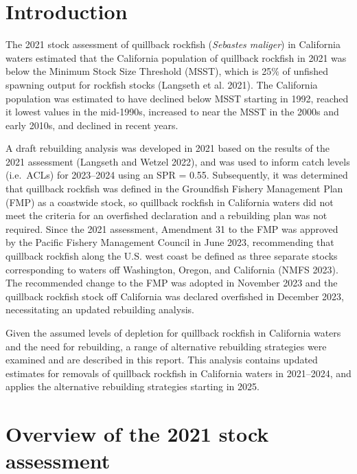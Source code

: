 \documentclass[11pt,
  letterpaper,
]{article}
\begin{document}
\hypertarget{introduction}{%
\section{Introduction}\label{introduction}}

The 2021 stock assessment of quillback rockfish (\emph{Sebastes maliger}) in California waters estimated that the California population of quillback rockfish in 2021 was below the Minimum Stock Size Threshold (MSST), which is 25\(\%\) of unfished spawning output for rockfish stocks (Langseth et al. 2021). The California population was estimated to have declined below MSST starting in 1992, reached it lowest values in the mid-1990s, increased to near the MSST in the 2000s and early 2010s, and declined in recent years.

A draft rebuilding analysis was developed in 2021 based on the results of the 2021 assessment (Langseth and Wetzel 2022), and was used to inform catch levels (i.e.~ACLs) for 2023--2024 using an SPR = 0.55. Subsequently, it was determined that quillback rockfish was defined in the Groundfish Fishery Management Plan (FMP) as a coastwide stock, so quillback rockfish in California waters did not meet the criteria for an overfished declaration and a rebuilding plan was not required. Since the 2021 assessment, Amendment 31 to the FMP was approved by the Pacific Fishery Management Council in June 2023, recommending that quillback rockfish along the U.S. west coast be defined as three separate stocks corresponding to waters off Washington, Oregon, and California (NMFS 2023). The recommended change to the FMP was adopted in November 2023 and the quillback rockfish stock off California was declared overfished in December 2023, necessitating an updated rebuilding analysis.

Given the assumed levels of depletion for quillback rockfish in California waters and the need for rebuilding, a range of alternative rebuilding strategies were examined and are described in this report. This analysis contains updated estimates for removals of quillback rockfish in California waters in 2021--2024, and applies the alternative rebuilding strategies starting in 2025.

\hypertarget{overview-of-the-2021-stock-assessment}{%
\section{Overview of the 2021 stock assessment}\label{overview-of-the-2021-stock-assessment}}
\end{document}

